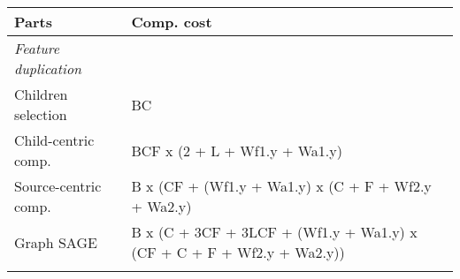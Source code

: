 \documentclass[10pt,oneside]{memoir}
\begin{document}
\begin{longtable}[]{@{}ll@{}}
\toprule
\begin{minipage}[b]{0.62\columnwidth}\raggedright
Parts\strut
\end{minipage} & \begin{minipage}[b]{0.32\columnwidth}\raggedright
Comp. cost\strut
\end{minipage}\tabularnewline
\midrule
\endhead
\begin{minipage}[t]{0.62\columnwidth}\raggedright
\emph{Feature duplication}\strut
\end{minipage} & \begin{minipage}[t]{0.32\columnwidth}\raggedright
\strut
\end{minipage}\tabularnewline
\begin{minipage}[t]{0.62\columnwidth}\raggedright
Children selection\strut
\end{minipage} & \begin{minipage}[t]{0.32\columnwidth}\raggedright
BC\strut
\end{minipage}\tabularnewline
\begin{minipage}[t]{0.62\columnwidth}\raggedright
Child-centric comp.\strut
\end{minipage} & \begin{minipage}[t]{0.32\columnwidth}\raggedright
BCF x (2 + L + Wf1.y + Wa1.y)\strut
\end{minipage}\tabularnewline
\begin{minipage}[t]{0.62\columnwidth}\raggedright
Source-centric comp.\strut
\end{minipage} & \begin{minipage}[t]{0.32\columnwidth}\raggedright
B x (CF + (Wf1.y + Wa1.y) x (C + F + Wf2.y + Wa2.y)\strut
\end{minipage}\tabularnewline
\begin{minipage}[t]{0.62\columnwidth}\raggedright
Graph SAGE\strut
\end{minipage} & \begin{minipage}[t]{0.32\columnwidth}\raggedright
B x (C + 3CF + 3LCF + (Wf1.y + Wa1.y) x (CF + C + F + Wf2.y +
Wa2.y))\strut
\end{minipage}\tabularnewline
\begin{minipage}[t]{0.62\columnwidth}\raggedright
\strut
\end{minipage} & \begin{minipage}[t]{0.32\columnwidth}\raggedright
\strut
\end{minipage}\tabularnewline

\end{longtable}
\end{document}
